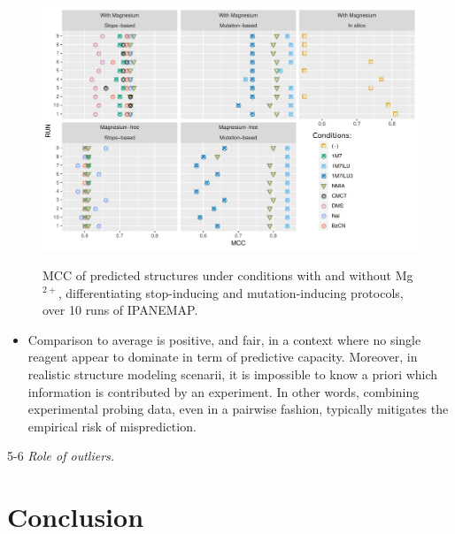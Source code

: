 \documentclass[a4,center,fleqn]{NAR}
\newcommand{\Blabla}[1][5-6]{{\color{blue!40!white}\lipsum*[#1]}}
\begin{document}
\begin{figure}
	{\centering\includegraphics[width=\linewidth]{graphs/Reproductibility}\\}
	
	\caption{MCC of predicted structures under conditions with and without Mg$^{2+}$, differentiating stop-inducing and mutation-inducing protocols, over 10 runs of IPANEMAP. }\label{fig:biclustering}
\end{figure}


\begin{itemize}
	\item Comparison to average is positive, and fair, in a context where no single reagent appear to dominate in term of predictive capacity. Moreover, in realistic structure modeling scenarii, it is impossible to know a priori which information is contributed by an experiment. In other words, combining experimental probing data, even in a pairwise fashion, typically mitigates the empirical risk of misprediction.
\end{itemize}



\Blabla{5-6}
{\em Role of outliers.} 




\Blabla[5-6]




\section{Conclusion}
\end{document}
